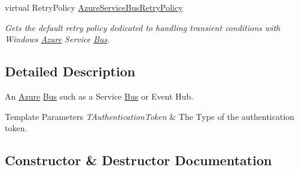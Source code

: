 \begin{DoxyCompactItemize}
virtual Retry\+Policy \hyperlink{classCqrs_1_1Azure_1_1ServiceBus_1_1AzureBus_a88997183f8e6fa9dcef5b883329e95ce_a88997183f8e6fa9dcef5b883329e95ce}{Azure\+Service\+Bus\+Retry\+Policy}
\begin{DoxyCompactList}\small\item\em Gets the default retry policy dedicated to handling transient conditions with Windows \hyperlink{namespaceCqrs_1_1Azure}{Azure} Service \hyperlink{namespaceCqrs_1_1Bus}{Bus}. \end{DoxyCompactList}\end{DoxyCompactItemize}


\subsection{Detailed Description}
An \hyperlink{namespaceCqrs_1_1Azure}{Azure} \hyperlink{namespaceCqrs_1_1Bus}{Bus} such as a Service \hyperlink{namespaceCqrs_1_1Bus}{Bus} or Event Hub. 


\begin{DoxyTemplParams}{Template Parameters}
{\em T\+Authentication\+Token} & The Type of the authentication token.\\
\hline
\end{DoxyTemplParams}


\subsection{Constructor \& Destructor Documentation}
\mbox{\label{classCqrs_1_1Azure_1_1ServiceBus_1_1AzureBus_a1046ff74282fd178f43e28420433d2a9_a1046ff74282fd178f43e28420433d2a9}} 
